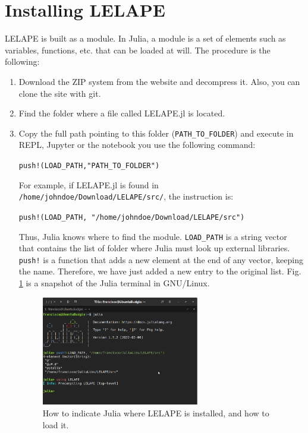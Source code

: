 \section{Installing LELAPE}
LELAPE is built as a module. In Julia, a module is a set of elements such as variables, functions, etc. that can be loaded at will. The procedure is the following:
%
\begin{enumerate}
	\item Download the ZIP system from the website and decompress it. Also, you can clone the site with git.
	\item Find the folder where a file called LELAPE.jl is located.
	\item Copy the full path pointing to this folder (\texttt{PATH\_TO\_FOLDER}) and execute in REPL, Jupyter or the notebook you use the following command:
	
	\vspace{1mm}
	\begin{center}
		\texttt{{push!(LOAD\_PATH,"PATH\_TO\_FOLDER")}}
	\end{center}
	\vspace{1mm}	
	
	For example, if LELAPE.jl is found in \texttt{/home/johndoe/Download/LELAPE/src/}, the instruction is:
		
	\vspace{1mm}
	\begin{center}
		\texttt{push!(LOAD\_PATH, "/home/johndoe/Download/LELAPE/src")}
	\end{center}
	\vspace{1mm}	
	
	Thus, Julia knows where to find the module. \texttt{LOAD\_PATH} is a string vector that contains the list of folder where Julia must look up external libraries. \texttt{push!} is a function that adds a new element at the end of any vector, keeping the name. Therefore, we have just added a new entry to the original list.	Fig. \ref{Fig:Loading_LELAPE} is a snapshot of the Julia terminal in GNU/Linux.
	\begin{figure}
		\centering
		
		\includegraphics[width=0.65\textwidth]{fig/Loading_LELAP.png}
		\caption{How to indicate Julia where LELAPE is installed, and how to load it.}
		\label{Fig:Loading_LELAPE}
	\end{figure}
	

\end{enumerate}
